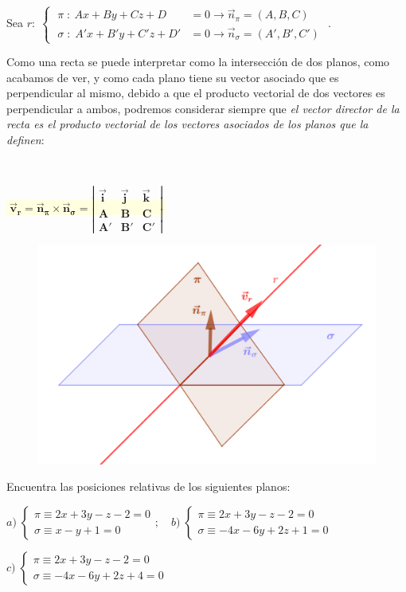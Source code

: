 Sea $r:\; \begin{cases} \; \pi \; :\ Ax+By+Cz+D&=0 \to \vec n_{\pi}=(A,B,C) \\ \; \sigma \; :\; A'x+B'y+C'z+D'&=0 \to \vec n_{\sigma}=(A',B',C') \end{cases}$ . 

Como una recta se puede interpretar como la intersección de dos planos, como acabamos de ver, y como cada plano tiene su vector asociado que es perpendicular al mismo, debido a que el producto vectorial de dos vectores es perpendicular a ambos, podremos considerar siempre que \textit{el vector director de la recta es el producto vectorial de los vectores asociados de los planos que la definen}:

\begin{multicols}{2}
$\quad$

 \centerline{\colorbox{LightYellow}{$\boldsymbol{\; \vec v_r= \vec n_{\pi} \times \vec n_{\sigma}=\left| \begin{matrix} \vec i& \vec j& \vec k \\ A&B&C \\ A'&B'&C' \end{matrix} \right|\;}$}}
 

	\begin{figure}[H]
		\centering
		\includegraphics[width=.5\textwidth]{imagenes/imagenes10/T10IM11.png}
 	\end{figure}
\end{multicols}
\justify

\begin{ejem}
Encuentra las posiciones relativas de los siguientes planos:

\noindent $a)\; \begin{cases} \pi \equiv 2x+3y-z-2=0 \\ \sigma \equiv x-y+1=0 \end{cases}; \quad b)\; \begin{cases} \pi \equiv 2x+3y-z-2=0 \\ \sigma \equiv -4x-6y+2z+1=0 \end{cases}$

\noindent $c)\; \begin{cases} \pi \equiv 2x+3y-z-2=0 \\ \sigma \equiv -4x-6y+2z+4=0 \end{cases}$
	
\end{ejem}

